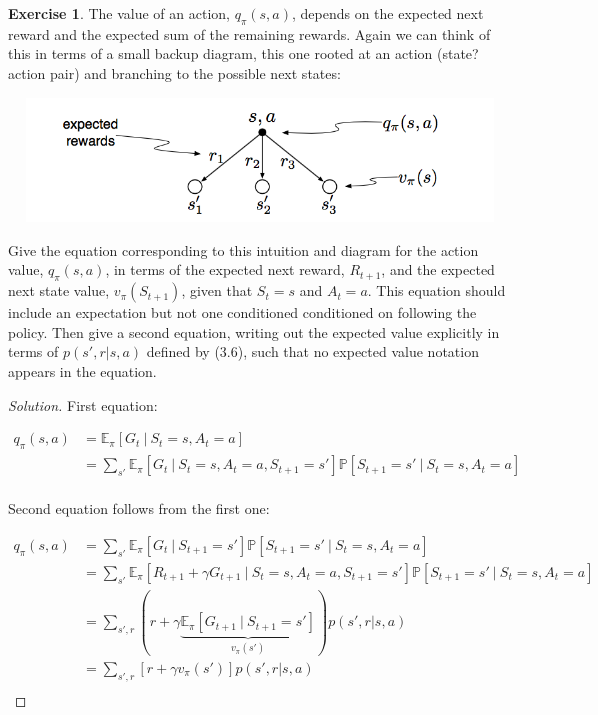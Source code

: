 \documentclass[oneside,11pt]{article}
\theoremstyle{definition}
\newtheorem{exer}[thm]{Exercise}
\newcommand{\PP}{\mathbb{P}}
\newcommand{\EEpi}{\mathbb{E}_{\pi}}
\newcommand{\vpi}{v_{\pi}}
\newcommand\givenbase[1][]{\:#1\lvert\:}
\let\given\givenbase
\newenvironment{solution}
{\renewcommand\qedsymbol{$\blacksquare$}\begin{proof}[Solution]} {\end{proof}}
\begin{document}
\begin{exer}
The value of an action, $q_{\pi}(s,a)$, depends on the expected next reward and the expected sum of the remaining rewards. Again we can think of this in terms of a small backup diagram, this one rooted at an action (state?action pair) and branching to the possible next states:

\includegraphics[width=13.5cm, height=3.3cm]{exer_3_12}

Give the equation corresponding to this intuition and diagram for the action value, $q_{\pi}(s,a)$, in terms of the expected next reward, $R_{t+1}$, and the expected next state value, $v_{\pi}(S_{t+1})$, given that $S_t = s$ and $A_t = a$. This equation should include an expectation but not one conditioned conditioned on following the policy. Then give a second equation, writing out the expected value explicitly in terms of $p(s',r|s,a)$ defined by (3.6), such that no expected value notation appears in the equation.
\end{exer}



\begin{shaded}
\begin{solution} 

First equation:

\begin{equation*} %
\begin{split}
q_{\pi}(s,a) & = \EEpi [G_t \given S_t = s, A_t = a] \\
 & =\sum_{s'} \EEpi [G_t \given S_t = s, A_t = a, S_{t+1} = s'] \PP[S_{t+1} = s' \given S_t = s, A_t = a] \\
\end{split}
\end{equation*}

Second equation follows from the first one:

\begin{equation*} %
\begin{split}
q_{\pi}(s,a) & =\sum_{s'} \EEpi [G_t \given S_{t+1} = s'] \PP[S_{t+1} = s' \given S_t = s, A_t = a] \\
& =  \sum_{s'} \EEpi [R_{t+1} + \gamma G_{t+1}  \given  S_t = s, A_t = a, S_{t+1} = s'] \PP[S_{t+1} = s' \given S_t = s, A_t = a] \\
& = \sum_{s',r} \left ( r + \gamma \underbrace{\EEpi [ G_{t+1}  \given  S_{t+1} = s']}_{\vpi(s')}  \right )p(s',r|s,a)\\
& = \sum_{s',r} \left [ r + \gamma \vpi(s')  \right ] p(s',r|s,a)\\
\end{split}
\end{equation*}




\end{solution}
\end{shaded}
\end{document}
